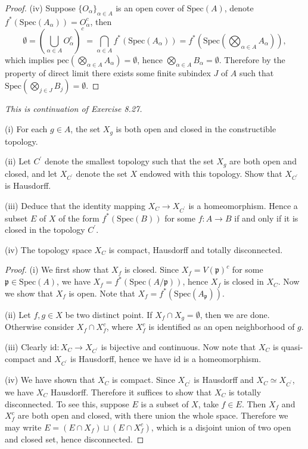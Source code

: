 \begin{proof}
(iv) Suppose $\{O_\alpha\}_{\alpha\in A}$ is an open cover of $\mathrm{Spec}(A)$, denote $f^*(\mathrm{Spec}(A_\alpha))=O_\alpha^c$, then 
$$
\emptyset =\left( \bigcup_{\alpha \in A}{O_{\alpha}^{c}} \right) ^c=\bigcap_{\alpha \in A}{f^*\left( \mathrm{Spec}\left( A_{\alpha} \right) \right)}=f^*\left( \mathrm{Spec}\left( \bigotimes_{\alpha \in A}{A_{\alpha}} \right) \right) ,
$$
which implies 
$\mathrm{pec}\left( \bigotimes_{\alpha \in A}{A_{\alpha}} \right) =\emptyset $, hence $\bigotimes_{\alpha \in A}{B_{\alpha}}=\emptyset $. Therefore by the property of direct limit there exists some finite subindex $J$ of $A$ such that $\mathrm{Spec}\left( \bigotimes_{j\in J}{B_j} \right) =\emptyset $.
\end{proof}
\begin{problem}\em
This is continuation of Exercise 8.27.\par
(i) For each $g\in A$, the set $X_g$ is both open and closed in the constructible topology.\par
(ii) Let $C^\prime$ denote the smallest topology such that the set $X_g$ are both open and closed, and let $X_{C^\prime}$ denote the set $X$ endowed with this topology. Show that $X_{C^\prime}$ is Hausdorff.\par
(iii) Deduce that the identity mapping $X_C\to X_{C^\prime}$ is a homeomorphism. Hence a subset $E$ of $X$ of the form $f^*(\mathrm{Spec}(B))$ for some $f:A\to B$ if and only if it is closed in the topology $C^\prime$.\par
(iv) The topology space $X_C$ is compact, Hausdorff and totally disconnected.
\end{problem}
\begin{proof}
(i) We first show that $X_f$ is closed. Since $X_f=V(\mathfrak{p})^c$ for some $\mathfrak{p}\in\mathrm{Spec}(A)$, we have $X_f=f^*(\mathrm{Spec}(A/\mathfrak{p}))$, hence $X_f$ is closed in $X_C$. Now we show that $X_f$ is open. Note that $X_f=f^*(\mathrm{Spec}(A_\mathfrak{p}))$.\par
(ii) Let $f,g\in X$ be two distinct point. If $X_f\cap X_g=\emptyset$, then we are done. Otherwise consider $X_f\cap X_f^c$, where $X_f^c$ is identified as an open neighborhood of $g$.\par
(iii) Clearly $\mathrm{id}:X_C\to X_{C^\prime}$ is bijective and continuous. Now note that $X_C$ is quasi-compact and $X_{C^\prime}$ is Hausdorff, hence we have $\mathrm{id}$ is a homeomorphism.\par
(iv) We have shown that $X_C$ is compact. Since $X_{C^\prime}$ is Hausdorff and $X_C\simeq X_{C^\prime}$, we have $X_C$ Hausdorff. Therefore it suffices to show that $X_C$ is totally disconnected. To see this, suppose $E$ is a subset of $X$, take $f\in E$. Then $X_f$ and $X_f^c$ are both open and closed, with there union the whole space. Therefore we may write $E=\left( E\cap X_f \right) \sqcup \left( E\cap X_{f}^{c} \right) $, which is a disjoint union of two open and closed set, hence disconnected.
\end{proof}
